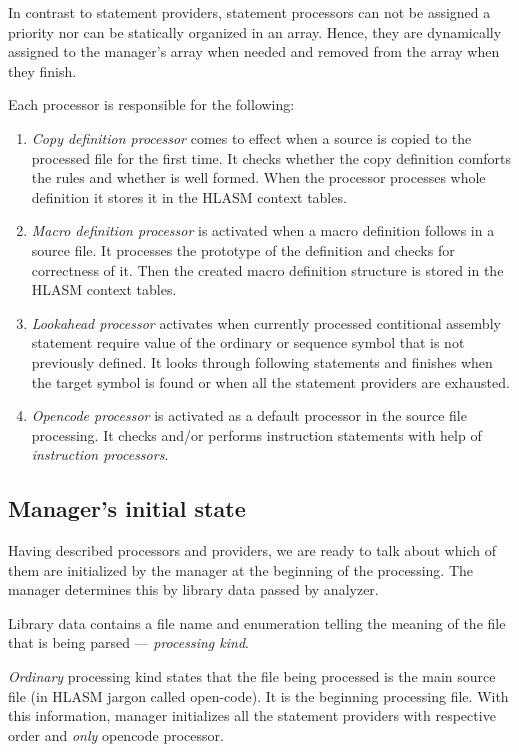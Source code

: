 In contrast to statement providers, statement processors can not be assigned a priority nor can be statically organized in an array. Hence, they are dynamically assigned to the manager's array when needed and removed from the array when they finish.

Each processor is responsible for the following:
\begin{enumerate}
	\item \emph{Copy definition processor} comes to effect when a source is copied to the processed file for the first time. It checks whether the copy definition comforts the rules and whether is well formed. When the processor processes whole definition it stores it in the HLASM context tables.
	\item \emph{Macro definition processor} is activated when a macro definition follows in a source file. It processes the prototype of the definition and checks for correctness of it. Then the created macro definition structure is stored in the HLASM context tables.
	\item \emph{Lookahead processor} activates when currently processed contitional assembly statement require value of the ordinary or sequence symbol that is not previously defined. It looks through following statements and finishes when the target symbol is found or when all the statement providers are exhausted.
	\item \emph{Opencode processor} is activated as a default processor in the source file processing. It checks and/or performs instruction statements with help of \emph{instruction processors}.
\end{enumerate}

\subsection{Manager's initial state}
Having described processors and providers, we are ready to talk about which of them are initialized by the manager at the beginning of the processing. The manager determines this by library data passed by analyzer.

Library data contains a file name and enumeration telling the meaning of the file that is being parsed --- \emph{processing kind}. 

\emph{Ordinary} processing kind states that the file being processed is the main source file (in HLASM jargon called open-code). It is the beginning processing file. With this information, manager initializes all the statement providers with respective order and \emph{only} opencode processor.

